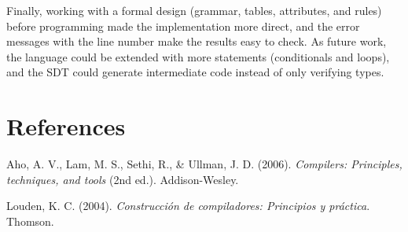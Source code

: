 \documentclass[12pt,letterpaper]{article}
\begin{document}
Finally, working with a formal design (grammar, tables, attributes, and rules) before programming made the implementation more direct, and the error messages with the line number make the results easy to check. As future work, the language could be extended with more statements (conditionals and loops), and the SDT could generate intermediate code instead of only verifying types.\\

\section{References}

\begingroup
\setlength{\parindent}{-1.27cm}
\setlength{\leftskip}{1.27cm}
\setlength{\parskip}{0.4cm}

Aho, A. V., Lam, M. S., Sethi, R., \& Ullman, J. D. (2006). \textit{Compilers: Principles, techniques, and tools} (2nd ed.). Addison-Wesley.

Louden, K. C. (2004). \textit{Construcción de compiladores: Principios y práctica}. Thomson.

\endgroup
\end{document}

